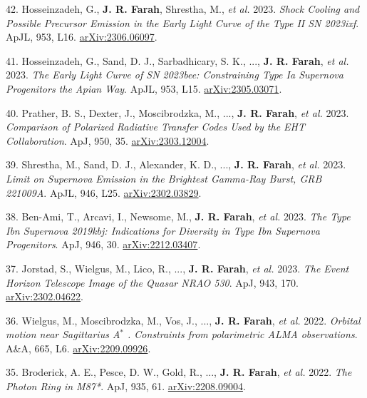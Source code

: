 \documentclass[margin,line]{res}
\newcommand{\apj}{ApJ}                    %
\newcommand{\apjl}{ApJL}                  %
\newcommand{\aap}{A\&A}                   %
\begin{document}
\begin{resume}
\begin{mdframed}[linecolor=red]
42. Hosseinzadeh, G., \textbf{J. R. Farah}, Shrestha, M., \textit{et al.} 2023. \textit{Shock Cooling and Possible Precursor Emission in the Early Light Curve of the Type II SN 2023ixf}. \apjl, 953, L16. \href{https://arxiv.org/abs/2306.06097}{arXiv:2306.06097}.

\end{mdframed}

41. Hosseinzadeh, G., Sand, D. J., Sarbadhicary, S. K., ..., \textbf{J. R. Farah}, \textit{et al.} 2023. \textit{The Early Light Curve of SN 2023bee: Constraining Type Ia Supernova Progenitors the Apian Way}. \apjl, 953, L15. \href{https://arxiv.org/abs/2305.03071}{arXiv:2305.03071}.

40. Prather, B. S., Dexter, J., Moscibrodzka, M., ..., \textbf{J. R. Farah}, \textit{et al.} 2023. \textit{Comparison of Polarized Radiative Transfer Codes Used by the EHT Collaboration}. \apj, 950, 35. \href{https://arxiv.org/abs/2303.12004}{arXiv:2303.12004}.

39. Shrestha, M., Sand, D. J., Alexander, K. D., ..., \textbf{J. R. Farah}, \textit{et al.} 2023. \textit{Limit on Supernova Emission in the Brightest Gamma-Ray Burst, GRB 221009A}. \apjl, 946, L25. \href{https://arxiv.org/abs/2302.03829}{arXiv:2302.03829}.

38. Ben-Ami, T., Arcavi, I., Newsome, M., \textbf{J. R. Farah}, \textit{et al.} 2023. \textit{The Type Ibn Supernova 2019kbj: Indications for Diversity in Type Ibn Supernova Progenitors}. \apj, 946, 30. \href{https://arxiv.org/abs/2212.03407}{arXiv:2212.03407}.

37. Jorstad, S., Wielgus, M., Lico, R., ..., \textbf{J. R. Farah}, \textit{et al.} 2023. \textit{The Event Horizon Telescope Image of the Quasar NRAO 530}. \apj, 943, 170. \href{https://arxiv.org/abs/2302.04622}{arXiv:2302.04622}.

\begin{mdframed}[linecolor=red]
36. Wielgus, M., Moscibrodzka, M., Vos, J., ..., \textbf{J. R. Farah}, \textit{et al.} 2022. \textit{Orbital motion near Sagittarius A$^{*}$ . Constraints from polarimetric ALMA observations}. \aap, 665, L6. \href{https://arxiv.org/abs/2209.09926}{arXiv:2209.09926}.

\end{mdframed}

35. Broderick, A. E., Pesce, D. W., Gold, R., ..., \textbf{J. R. Farah}, \textit{et al.} 2022. \textit{The Photon Ring in M87*}. \apj, 935, 61. \href{https://arxiv.org/abs/2208.09004}{arXiv:2208.09004}.


\end{resume}
\end{document}
